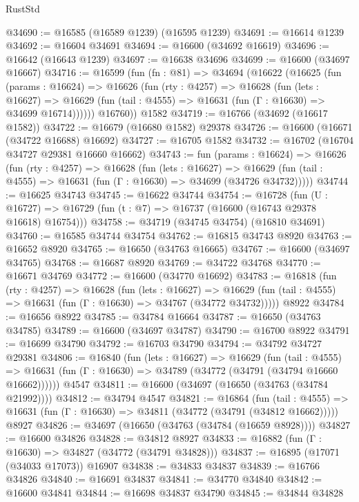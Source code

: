 \begin{lexlean}{RustStd}
\begin{coremodule}
{\begin{coremodule}
{{{{{{{{{{{{{{{{{{{{{{{{{{{{{{{{{{{{{{{{{{{{{{{{{{{{{{{@34690 := @16585 (@16589 @1239) (@16595 @1239)
@34691 := @16614 @1239
@34692 := @16604 @34691
@34694 := @16600 (@34692 @16619)
@34696 := @16642 (@16643 @1239)
@34697 := @16638 @34696
@34699 := @16600 (@34697 @16667)
@34716 := @16599
    (fun (fn : @81) =>
    @34694
      (@16622
        (@16625
          (fun (params : @16624) =>
          @16626
            (fun (rty : @4257) =>
            @16628
              (fun (lets : @16627) =>
              @16629 (fun (tail : @4555) => @16631 (fun (Γ : @16630) => @34699 @16714))))))
        @16760))
    @1582
@34719 := @16766 (@34692 (@16617 @1582))
@34722 := @16679 (@16680 @1582) @29378
@34726 := @16600 (@16671 (@34722 @16688) @16692)
@34727 := @16705 @1582
@34732 := @16702 (@16704 @34727 @29381 @16660 @16662)
@34743 := fun (params : @16624) =>
  @16626
    (fun (rty : @4257) =>
    @16628
      (fun (lets : @16627) =>
      @16629 (fun (tail : @4555) => @16631 (fun (Γ : @16630) => @34699 (@34726 @34732)))))
@34744 := @16625 @34743
@34745 := @16622 @34744
@34754 := @16728
    (fun (U : @16727) => @16729 (fun (t : @7) => @16737 (@16600 (@16743 @29378 @16618) @16754)))
@34758 := @34719 (@34745 @34754) (@16810 @34691)
@34760 := @16585 @34744 @34754
@34762 := @16815 @34743 @8920
@34763 := @16652 @8920
@34765 := @16650 (@34763 @16665)
@34767 := @16600 (@34697 @34765)
@34768 := @16687 @8920
@34769 := @34722 @34768
@34770 := @16671 @34769
@34772 := @16600 (@34770 @16692)
@34783 := @16818
    (fun (rty : @4257) =>
    @16628
      (fun (lets : @16627) =>
      @16629 (fun (tail : @4555) => @16631 (fun (Γ : @16630) => @34767 (@34772 @34732)))))
    @8922
@34784 := @16656 @8922
@34785 := @34784 @16664
@34787 := @16650 (@34763 @34785)
@34789 := @16600 (@34697 @34787)
@34790 := @16700 @8922
@34791 := @16699 @34790
@34792 := @16703 @34790
@34794 := @34792 @34727 @29381
@34806 := @16840
    (fun (lets : @16627) =>
    @16629
      (fun (tail : @4555) =>
      @16631 (fun (Γ : @16630) => @34789 (@34772 (@34791 (@34794 @16660 @16662))))))
    @4547
@34811 := @16600 (@34697 (@16650 (@34763 (@34784 @21992))))
@34812 := @34794 @4547
@34821 := @16864
    (fun (tail : @4555) => @16631 (fun (Γ : @16630) => @34811 (@34772 (@34791 (@34812 @16662)))))
    @8927
@34826 := @34697 (@16650 (@34763 (@34784 (@16659 @8928))))
@34827 := @16600 @34826
@34828 := @34812 @8927
@34833 := @16882 (fun (Γ : @16630) => @34827 (@34772 (@34791 @34828)))
@34837 := @16895 (@17071 (@34033 @17073)) @16907
@34838 := @34833 @34837
@34839 := @16766 @34826
@34840 := @16691 @34837
@34841 := @34770 @34840
@34842 := @16600 @34841
@34844 := @16698 @34837 @34790
@34845 := @34844 @34828
}}}}}}}}}}}}}}}}}}}}}}}}}}}}}}}}}}}}}}}}}}}}}}}}}}}}}}}
\end{coremodule}}
\end{coremodule}
\end{lexlean}
